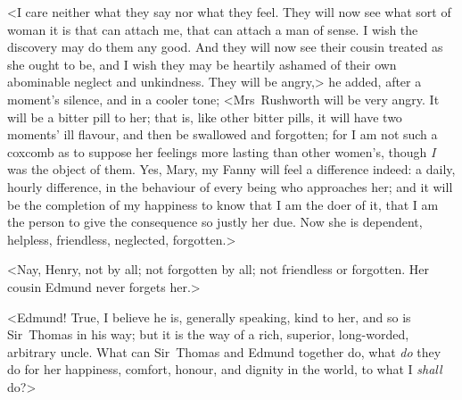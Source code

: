 <I care neither what they say nor what they feel. They will now see what sort of woman it is that can attach me, that can attach a man of sense. I wish the discovery may do them any good. And they will now see their cousin treated as she ought to be, and I wish they may be heartily ashamed of their own abominable neglect and unkindness. They will be angry,> he added, after a moment's silence, and in a cooler tone; <Mrs~Rushworth will be very angry. It will be a bitter pill to her; that is, like other bitter pills, it will have two moments' ill flavour, and then be swallowed and forgotten; for I am not such a coxcomb as to suppose her feelings more lasting than other women's, though \textit{I}  was the object of them. Yes, Mary, my Fanny will feel a difference indeed: a daily, hourly difference, in the behaviour of every being who approaches her; and it will be the completion of my happiness to know that I am the doer of it, that I am the person to give the consequence so justly her due. Now she is dependent, helpless, friendless, neglected, forgotten.>

<Nay, Henry, not by all; not forgotten by all; not friendless or forgotten. Her cousin Edmund never forgets her.>

<Edmund! True, I believe he is, generally speaking, kind to her, and so is Sir~Thomas in his way; but it is the way of a rich, superior, long-worded, arbitrary uncle. What can Sir~Thomas and Edmund together do, what \textit{do}  they do for her happiness, comfort, honour, and dignity in the world, to what I \textit{shall}  do?> 